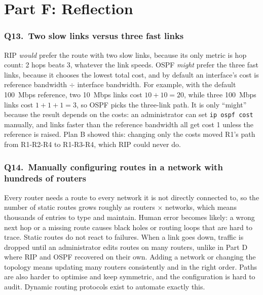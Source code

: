 \documentclass[11pt,a4paper]{article}
\newcommand{\cmd}[1]{\texttt{#1}}
\newcommand{\question}[2]{\subsubsection*{Q#1.\ #2}}
\begin{document}
\section{Part F: Reflection}

\question{13}{Two slow links versus three fast links}
RIP \emph{would} prefer the route with two slow links, because its only metric is hop count: 2
hops beats 3, whatever the link speeds. OSPF \emph{might} prefer the three fast links,
because it chooses the lowest total cost, and by default an interface's cost is reference
bandwidth $\div$ interface bandwidth. For example, with the default 100~Mbps reference, two
10~Mbps links cost $10 + 10 = 20$, while three 100~Mbps links cost $1 + 1 + 1 = 3$, so OSPF
picks the three-link path. It is only ``might'' because the result depends on the costs: an
administrator can set \cmd{ip ospf cost} manually, and links faster than the reference bandwidth
all get cost 1 unless the reference is raised. Plan B showed this: changing only the costs
moved R1's path from R1-R2-R4 to R1-R3-R4, which RIP could never do.

\question{14}{Manually configuring routes in a network with hundreds of routers}
Every router needs a route to every network it is not directly connected to, so the number
of static routes grows roughly as routers $\times$ networks, which means thousands of entries to
type and maintain. Human error becomes likely: a wrong next hop or a missing route
causes black holes or routing loops that are hard to trace. Static routes do not react to
failures. When a link goes down, traffic is dropped until an administrator edits routes on
many routers, unlike in Part D where RIP and OSPF recovered on their own. Adding a
network or changing the topology means updating many routers consistently and in the
right order. Paths are also harder to optimise and keep symmetric, and the configuration is
hard to audit. Dynamic routing protocols exist to automate exactly this.
\end{document}

